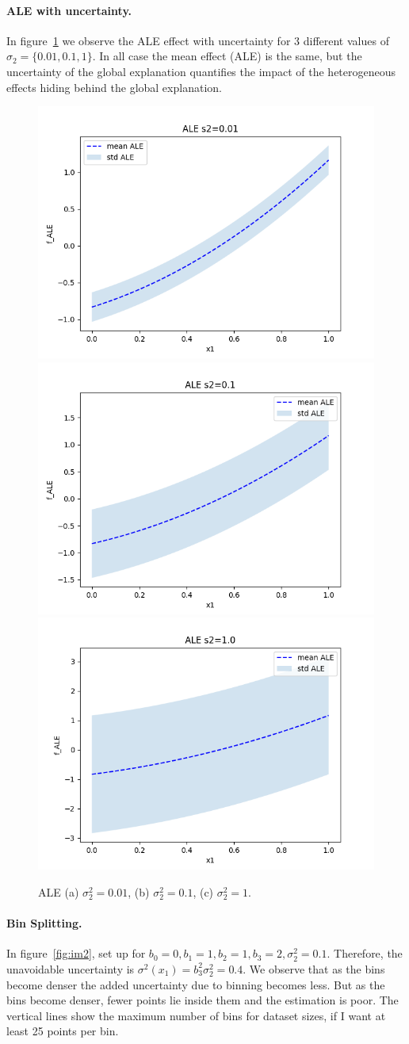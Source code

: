 \documentclass{article}
\begin{document}
\paragraph{ALE with uncertainty.}

In figure~\ref{fig:bullet-1-im-3} we observe the ALE effect with
uncertainty for 3 different values of \(\sigma_2 = \{0.01, 0.1,
1\}\).
In all case the mean effect (ALE) is the same, but the
uncertainty of the global explanation quantifies the impact of the
heterogeneous effects hiding behind the global explanation.

\begin{figure}[!h]
  \centering
  \includegraphics[width=.32\linewidth]{./example_gromping_paper/ALE_gt_s2_0_01}
  \includegraphics[width=.32\linewidth]{./example_gromping_paper/ALE_gt_s2_0_1}
  \includegraphics[width=.32\linewidth]{./example_gromping_paper/ALE_gt_s2_1_0}
  \caption{ALE (a) \(\sigma_2^2 = 0.01\), (b) \(\sigma_2^2 = 0.1\), (c) \(\sigma_2^2 = 1.\)}
  \label{fig:bullet-1-im-3}
\end{figure}


\paragraph{Bin Splitting.}

In figure~\ref{fig:im2}, set up for
\(b_0=0, b_1=1, b_2=1, b_3=2, \sigma_2^2 = 0.1\).
Therefore, the
unavoidable uncertainty is \(\sigma^2(x_1) = b_3^2 \sigma_2^2 =
0.4\).
We observe that as the bins become denser the added
uncertainty due to binning becomes less.
But as the bins become denser, fewer points lie inside them and the estimation is poor.
The
vertical lines show the maximum number of bins for dataset sizes, if I
want at least 25 points per bin.
\end{document}
